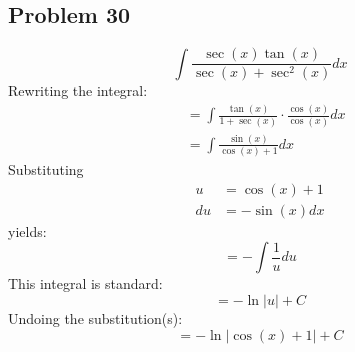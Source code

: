 \documentclass{article}
\begin{document}
\subsection*{Problem 30}
$$\int\frac{\sec\left(x\right)\tan\left(x\right)}{\sec\left(x\right)+\sec^2\left(x\right)}dx$$
Rewriting the integral:
\begin{align*}
&=\int\frac{\tan(x)}{1+\sec(x)}\cdot\frac{\cos(x)}{\cos(x)}dx \\
&=\int\frac{\sin(x)}{\cos(x)+1}dx
\end{align*}
Substituting
\begin{align*}
u&=\cos(x)+1 \\
du&=-\sin(x)dx
\end{align*}
yields:
$$=-\int\frac{1}{u}du$$
This integral is standard:
$$=-\ln\left|u\right|+C$$
Undoing the substitution(s):
$$=-\ln\left|\cos(x)+1\right|+C$$
\end{document}
